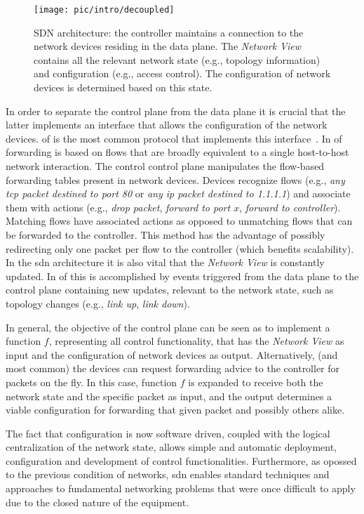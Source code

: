 \begin{figure}
  \centering 
  \footnotesize
  \texttt{[image: pic/intro/decoupled]}
  \caption[SDN architecture]{SDN architecture: the controller maintains a connection to the network devices residing in the data plane. The \emph{Network View} contains all the relevant network state (e.g., topology information) and configuration (e.g., access control). The configuration of network devices is determined based on this state.}
  \label{fig:sdn.2d}
\end{figure}

In order to separate the control plane from the data plane it is crucial that the latter implements an interface that allows  the configuration of the network devices. 
\gls{of} is the most common protocol that implements this interface~\cite{openflow}.
In \gls{of} forwarding is based on flows that are broadly equivalent to a single host-to-host network interaction. 
The control control plane  manipulates the flow-based forwarding tables present in network devices. 
Devices recognize flows (e.g., \emph{any tcp packet destined to port 80} or \emph{any ip packet destined to 1.1.1.1}) and associate them with actions (e.g., \emph{drop packet}, \emph{forward to port $x$}, \emph{forward to controller}). 
Matching flows have associated actions as opposed to unmatching flows that can be  forwarded to the controller. 
This method has the advantage of possibly redirecting only one packet per flow to the controller (which benefits scalability). 
In the  \gls{sdn} architecture it is also vital that the \emph{Network View} is constantly updated. 
In \gls{of} this is accomplished by events triggered from the data plane to the control plane containing new updates, relevant to the network state,  such as topology changes (e.g., \emph{link up}, \emph{link down}).  

In general, the objective of the control plane can be seen as to implement a function $f$, representing all control functionality,  that has the \emph{Network View}  as  input and the configuration of network devices as output. 
Alternatively, (and most common) the devices can request forwarding advice to the controller for packets on the fly. 
 In this case, function $f$  is expanded to receive both the network state and the specific packet as input, and the output determines  a viable configuration for forwarding that given packet and possibly others alike. 


The fact that configuration is now software driven, coupled with the logical centralization of the network state, allows simple and automatic deployment, configuration and development of  control functionalities. 
Furthermore, as opossed to the previous condition of networks, \gls{sdn} enables standard techniques and approaches to fundamental networking problems that were once difficult to apply due to the closed nature of the equipment. 

